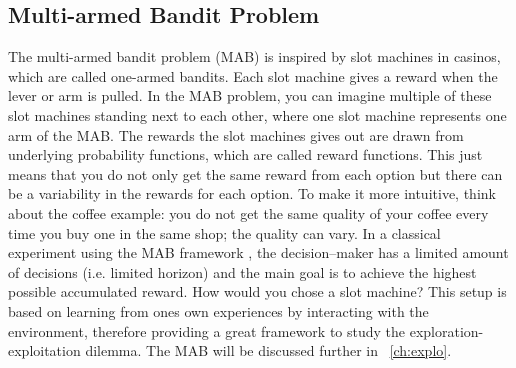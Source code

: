 \subsection{Multi-armed Bandit Problem}
The multi-armed bandit problem (MAB) is inspired by slot machines in casinos, which are called one-armed bandits. Each slot machine gives a reward when the lever or arm is pulled. In the MAB problem, you can imagine multiple of these slot machines standing next to each other, where one slot machine represents one arm of the MAB. 
The rewards the slot machines gives out are drawn from underlying probability functions, which are called reward functions. This just means that you do not only get the same reward from each option but there can be a variability in the rewards for each option. To make it more intuitive, think about the coffee example: you do not get the same quality of your coffee every time you buy one in the same shop; the quality can vary. 
In a classical experiment using the MAB framework \citep{cohen2007should, daw2006cortical, schulz2017putting}, the decision--maker has a limited amount of decisions (i.e. limited horizon) and the main goal is to achieve the highest possible accumulated reward.
How would you chose a slot machine?
This setup is based on learning from ones own experiences by interacting with the environment, therefore providing a great framework to study the exploration-exploitation dilemma. The MAB will be discussed further in ~\ref{ch:explo}.





